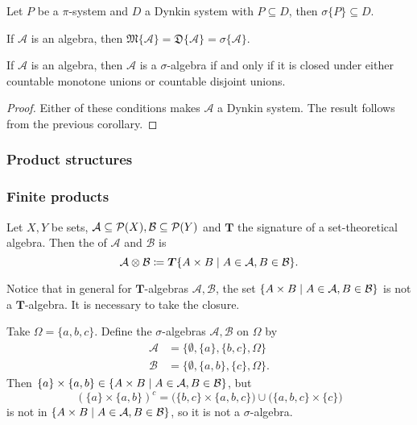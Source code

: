 \begin{corollary} \label{piLambdaTheorem}
Let $P$ be a $\pi$-system and $D$ a Dynkin system with $P\subseteq D$, then $\sigma\{P\} \subseteq D$.
\end{corollary}
\begin{corollary}
If $\mathcal{A}$ is an algebra, then $\mathfrak{M}\{\mathcal{A}\} = \mathfrak{D}\{\mathcal{A}\} = \sigma\{\mathcal{A}\}$.
\end{corollary}
\begin{corollary} \label{conditionAlgebraIsSigmaAlgebra}
If $\mathcal{A}$ is an algebra, then $\mathcal{A}$ is a $\sigma$-algebra \textup{if and only if} it is closed under either countable monotone unions or countable disjoint unions.
\end{corollary}
\begin{proof}
Either of these conditions makes $\mathcal{A}$ a Dynkin system. The result follows from the previous corollary.
\end{proof}

\subsubsection{Product structures}
\subsubsection{Finite products}
\begin{definition}
Let $X,Y$ be sets, $\mathcal{A}\subseteq \operatorname{\mathcal{P}}(X), \mathcal{B}\subseteq\operatorname{\mathcal{P}}(Y)$ and $\boldsymbol{T}$ the signature of a set-theoretical algebra. Then the  of $\mathcal{A}$ and $\mathcal{B}$ is
\[ \mathcal{A}\otimes\mathcal{B} \defeq \boldsymbol{T}\setbuilder{A\times B}{A\in \mathcal{A}, B\in \mathcal{B}}. \]
\end{definition}
Notice that in general for $\boldsymbol{T}$-algebras $\mathcal{A},\mathcal{B}$, the set $\setbuilder{A\times B}{A\in \mathcal{A}, B\in\mathcal{B}}$ is not a $\boldsymbol{T}$-algebra. It is necessary to take the closure.

\begin{example}
Take $\Omega = \{a,b,c\}$. Define the $\sigma$-algebras $\mathcal{A},\mathcal{B}$ on $\Omega$ by
\begin{align*}
\mathcal{A} &= \{\emptyset, \{a\}, \{b,c\}, \Omega\} \\
\mathcal{B} &= \{\emptyset, \{a, b\}, \{c\}, \Omega\}.
\end{align*}
Then $\{a\}\times\{a,b\} \in \setbuilder{A\times B}{A\in \mathcal{A}, B\in\mathcal{B}}$, but
\[ (\{a\}\times\{a,b\})^c = \Big(\{b,c\}\times \{a,b,c\}\Big) \cup \Big(\{a, b ,c\}\times\{c\}\Big) \]
is not in $\setbuilder{A\times B}{A\in \mathcal{A}, B\in\mathcal{B}}$, so it is not a $\sigma$-algebra.
\end{example}


